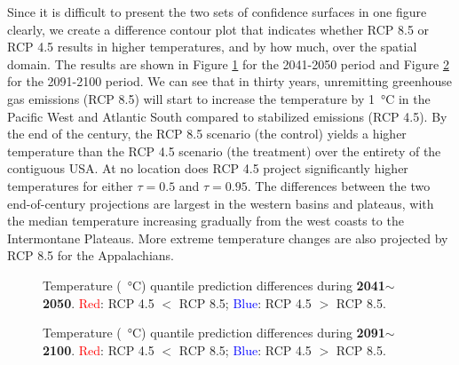 \documentclass{statsoc}
\begin{document}
Since it is difficult to present the two sets of confidence surfaces in one figure clearly, we create a difference contour plot that indicates whether RCP 8.5 or RCP 4.5 results in higher temperatures, and by how much, over the spatial domain. The results are shown in Figure \ref{fig:2dim_50} for the 2041-2050 period and Figure \ref{fig:2dim} for the 2091-2100 period. We can see that in thirty years, unremitting greenhouse gas emissions (RCP 8.5) will start to increase the temperature by 1\SI{}{\celsius} in the Pacific West and Atlantic South compared to stabilized emissions (RCP 4.5). By the end of the century, the RCP 8.5 scenario (the control) yields a higher temperature than the RCP 4.5 scenario (the treatment) over the entirety of the contiguous USA. At no location does RCP 4.5 project significantly higher temperatures for either $\tau=0.5$ and $\tau=0.95$.   {The differences between the two end-of-century projections are largest in the western basins and plateaus, with the median temperature increasing gradually from the west coasts to the Intermontane Plateaus.} More extreme temperature changes are also projected by RCP 8.5 for the Appalachians.
\begin{figure}
\centering
\caption{Temperature (\SI{}{\celsius}) quantile prediction differences during \textbf{2041$\sim$2050}. \textcolor{red}{Red}: RCP 4.5 $<$ RCP 8.5; \textcolor{blue}{Blue}: RCP 4.5 $>$ RCP 8.5.}
\label{fig:2dim_50}
\end{figure}

\begin{figure}
\centering
\caption{Temperature (\SI{}{\celsius}) quantile prediction differences during \textbf{2091$\sim$2100}. \textcolor{red}{Red}: RCP 4.5 $<$ RCP 8.5; \textcolor{blue}{Blue}: RCP 4.5 $>$ RCP 8.5.}
\label{fig:2dim}
\end{figure}
\end{document}
